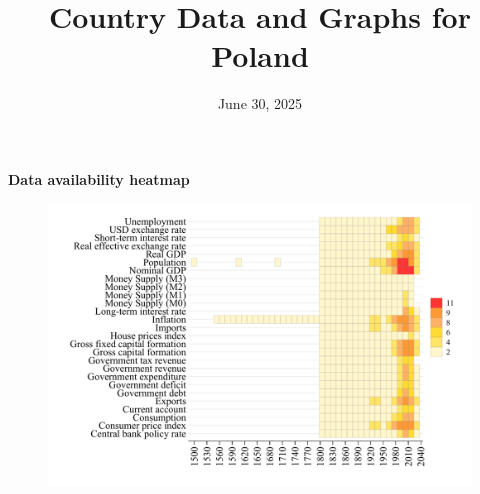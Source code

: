 \documentclass[12pt,a4paper,landscape]{article}
\begin{document}
\title{\Large Country Data and Graphs for Poland}
\date{June 30, 2025}
\maketitle
\thispagestyle{empty}

\clearpage
\setcounter{page}{1}
\hypersetup{colorlinks=true,linkcolor=blue,linktoc=all}
\label{toc}
\tableofcontents
\thispagestyle{empty}
\clearpage
{}
{}
\begin{center}
{\Large\bfseries Data availability heatmap}
\end{center}
\vspace{1cm}
\begin{figure}[H]
\centering
\includegraphics[width=\textwidth,height=0.8\textheight,keepaspectratio]{graphs/POL_heatmap.pdf}
\end{figure}
\setcounter{page}{3}
\end{document}
